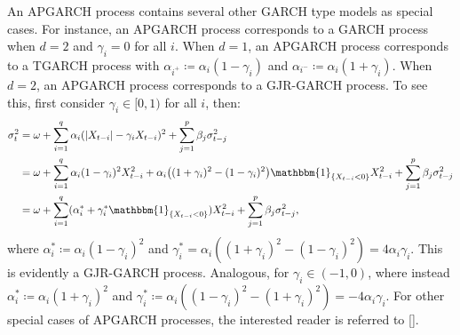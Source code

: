 An APGARCH process contains several other GARCH type models as special cases. For instance, an APGARCH process corresponds to a GARCH process when $d=2$ and $\gamma_{i}=0$ for all $i$. When $d=1$, an APGARCH process corresponds to a TGARCH process with $\alpha_{i^{+}}\coloneqq\alpha_{i}(1-\gamma_{i})$ and $\alpha_{i^{-}}\coloneqq\alpha_{i}(1+\gamma_{i})$. When $d=2$, an APGARCH process corresponds to a GJR-GARCH process. To see this, first consider $\gamma_{i}\in[0,1)$ for all $i$, then:
\begin{align*}
    \sigma_{t}^{2}&=\omega+\sum_{i=1}^{q}\alpha_{i}(\abs{X_{t-i}}-\gamma_{i}X_{t-i})^{2}+\sum_{j=1}^{p}\beta_{j}\sigma_{t-j}^{2}\\
    &=\omega+\sum_{i=1}^{q}\alpha_{i}(1-\gamma_{i})^{2}X_{t-i}^{2}+\alpha_{i}\left((1+\gamma_{i})^{2}-(1-\gamma_{i})^{2}\right)\mathbbm{1}_{\{X_{t-i}<0\}}X_{t-i}^{2}+\sum_{j=1}^{p}\beta_{j}\sigma_{t-j}^{2}\\
    &=\omega+\sum_{i=1}^{q}(\alpha_{i}^{*}+\gamma_{i}^{*}\mathbbm{1}_{\{X_{t-i}<0\}})X_{t-i}^{2}+\sum_{j=1}^{p}\beta_{j}\sigma_{t-j}^{2},
\end{align*}
where $\alpha_{i}^{*}\coloneqq\alpha_{i}(1-\gamma_{i})^{2}$ and $\gamma_{i}^{*}=\alpha_{i}\left((1+\gamma_{i})^{2}-(1-\gamma_{i})^{2}\right)=4\alpha_{i}\gamma_{i}$. This is evidently a GJR-GARCH process. Analogous, for $\gamma_{i}\in(-1,0)$, where instead $\alpha_{i}^{*}\coloneqq\alpha_{i}(1+\gamma_{i})^{2}$ and $\gamma_{i}^{*}\coloneqq\alpha_{i}\left((1-\gamma_{i})^{2}-(1+\gamma_{i})^{2}\right)=-4\alpha_{i}\gamma_{i}$. For other special cases of APGARCH processes, the interested reader is referred to \ref{}. %


